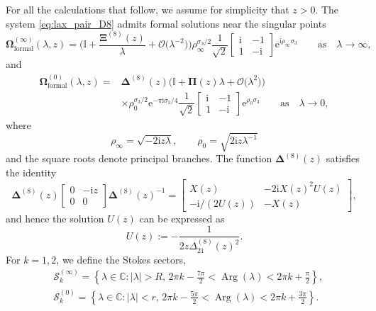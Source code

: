 \documentclass[pdftex]{sigma}
\numberwithin{equation}{section}
\newcommand{\ee}{\mathrm{e}}
\newcommand{\ii}{\mathrm{i}}
\newcommand{\C}{{\mathbb{C}}}
\renewcommand{\arg}{\operatorname{Arg}}
\begin{document}
For all the calculations that follow, we assume for simplicity that $z > 0$. The system \eqref{eq:lax_pair_D8} admits formal solutions near the singular points
\begin{equation}\label{eq:Omega-expand-infty-early}
\mathbf{\Omega}_{\text{formal}}^{(\infty)}(\lambda,z) = \bigg( \mathbb{I} + \frac{\mathbf{\Xi}^{(8)}(z)}{\lambda}+\mathcal{O}\big(\lambda^{-2}\big) \bigg) \rho_\infty^{\sigma_3/2}
 {\dfrac{1}{\sqrt{2}}} \begin{bmatrix} \ii & -1\\ 1 &-\ii \end{bmatrix} \ee^{\ii \rho_\infty \sigma_3} \qquad \text{as} \quad \lambda \to \infty,
\end{equation}
and
\begin{align}
\mathbf{\Omega}^{(0)}_{\text{formal}}(\lambda, z) ={}& {\mathbf{\Delta}}^{(8)}(z)\big( \mathbb{I} +\mathbf{\Pi}(z)\lambda+ \mathcal{O}\big(\lambda^2\big) \big)\nonumber\\
&\times\rho_0^{\sigma_3/2} \ee^{-\pi \ii \sigma_3/4}{\dfrac{1}{\sqrt{2}}} {}{} \begin{bmatrix} \ii & -1 \\ 1 &-\ii \end{bmatrix} \ee^{ \rho_0 \sigma_3} \qquad \text{as} \quad \lambda \to 0,\label{eq:Omega-expand-zero-early}
\end{align}
where
\begin{equation*}
\rho_\infty=\sqrt{-2 \ii z\lambda},\qquad \rho_0= \sqrt{2 \ii z\lambda^{-1}}
\end{equation*}
 and the square roots denote principal branches.
The function ${\mathbf{\Delta}}^{(8)}(z)$ satisfies the identity
\begin{equation}
{\mathbf{\Delta}}^{(8)}(z)\begin{bmatrix}0&-\ii z\\0&0\end{bmatrix}{\mathbf{\Delta}}^{(8)}(z)^{-1}=\begin{bmatrix}X(z) & -2\ii X(z)^2U(z)\\-\ii/(2U(z)) & -X(z)\end{bmatrix},
\label{eq:Delta-U-X-identity}
\end{equation}
and hence the solution $U(z)$ can be expressed as
\begin{equation}\label{eq:un-U-early}
U(z):=-\frac{1}{2z\Delta^{(8)}_{21}(z)^2}.
\end{equation}
For $k = 1, 2$, we define the Stokes sectors,
\begin{align*}
&\mathcal S_k^{(\infty)}= \left \{ \lambda \in \C \colon  |\lambda| > R, \, 2\pi k - \frac{7\pi}{2} < \arg (\lambda) < 2\pi k+\frac{\pi}{2} \right \},\\
&\mathcal S_k^{(0)}= \left \{ \lambda \in \C \colon  |\lambda| < r, \, 2\pi k - \frac{5\pi}{2} < \arg (\lambda) < 2\pi k+\frac{3\pi}{2}\right \}.
\end{align*}
\end{document}
